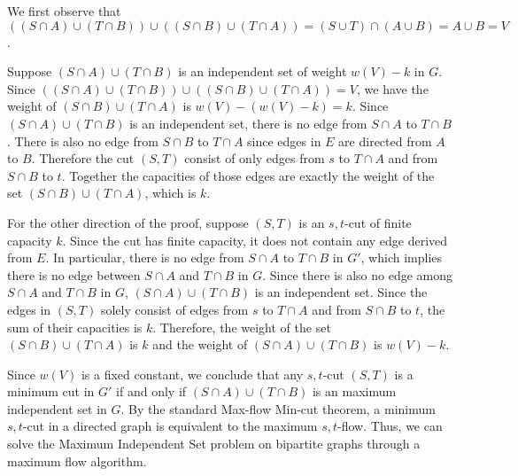 \documentclass{bmcart}
\begin{document}
We first observe that $((S \cap A) \cup (T\cap B)) \cup ((S \cap B) \cup (T \cap A)) = (S\cup T) \cap (A \cup B) = A \cup B = V$. \smallskip

Suppose $(S \cap A) \cup (T\cap B)$ is an independent set of weight $w(V) - k$ in $G$. Since $((S \cap A) \cup (T\cap B)) \cup ((S \cap B) \cup (T \cap A)) = V$, we have the weight of $(S \cap B) \cup (T \cap A)$ is $w(V)-(w(V)-k) = k$. Since $(S \cap A) \cup (T\cap B)$ is an independent set, there is no edge from $S \cap A$ to $T\cap B$. There is also no edge from $S \cap B$ to $T \cap A$ since edges in $E$ are directed from $A$ to $B$. Therefore the cut $(S,T)$ consist of only edges from $s$ to $T \cap A$ and from $S \cap B$ to $t$. Together the capacities of those edges are exactly the weight of the set $(S \cap B) \cup (T \cap A)$, which is $k$. \smallskip

For the other direction of the proof, suppose $(S,T)$ is an $s,t$-cut of finite capacity $k$. Since the cut has finite capacity, it does not contain any edge derived from $E$. In particular, there is no edge from $S \cap A$ to $T \cap B$ in $G'$, which implies there is no edge between $S\cap A$ and $T\cap B$ in $G$. Since there is also no edge among $S\cap A$ and $T\cap B$ in $G$, $(S\cap A) \cup (T \cap B)$ is an independent set. Since the edges in $(S,T)$ solely consist of edges from $s$ to $T \cap A$ and from $S \cap B$ to $t$, the sum of their capacities is $k$. Therefore, the weight of the set $(S \cap B) \cup (T \cap A)$ is $k$ and the weight of $(S\cap A) \cup (T \cap B)$ is $w(V)- k$.\smallskip

Since $w(V)$ is a fixed constant, we conclude that any $s,t$-cut $(S,T)$ is a minimum cut in $G'$ if and only if $(S\cap A) \cup (T \cap B)$ is an maximum independent set in $G$. By the standard Max-flow Min-cut theorem, a minimum $s,t$-cut in a directed graph is equivalent to the maximum $s,t$-flow. Thus, we can solve the Maximum Independent Set problem on bipartite graphs through a maximum flow algorithm.\smallskip
\end{document}
